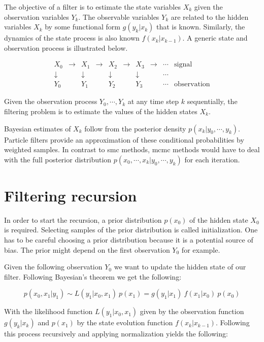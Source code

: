 The objective of a filter is to estimate the state variables $X_k$ given the observation variables $Y_k$. The observable variables $Y_k$ are related to the hidden variables $X_k$ by some functional form $g(y_k|x_k)$ that is known. Similarly, the dynamics of the state process is also known $f(x_k|x_{k-1})$. A generic state and observation process is illustrated below.

\[\begin{array}{cccccccccc}
X_0 & \to & X_1 & \to & X_2 & \to & X_3 & \to & \cdots & \text{signal} \\
\downarrow & & \downarrow & & \downarrow & & \downarrow & & \cdots & \\
Y_0 & & Y_1 & & Y_2 & & Y_3 & & \cdots & \text{observation}
\end{array}\]

Given the observation process $Y_0,\cdots ,Y_k$ at any time step $k$ sequentially, the filtering problem is to estimate the values of the hidden states $X_k$.

Bayesian estimates of $X_k$ follow from the posterior density $p(x_k|y_0,\cdots,y_k)$. Particle filters provide an approximation of these conditional probabilities by weighted samples. In contrast to \gls{smc} methods, \gls{mcmc} methods would have to deal with the full posterior distribution $p(x_0,\cdots,x_k|y_0,\cdots,y_k)$ for each iteration.

\section{Filtering recursion}

In order to start the recursion, a prior distribution $p(x_0)$ of the hidden state $X_0$ is required. Selecting samples of the prior distribution is called initialization. One has to be careful choosing a prior distribution because it is a potential source of bias. The prior might depend on the first observation $Y_0$ for example.

Given the following observation $Y_0$ we want to update the hidden state of our filter. Following Bayesian's theorem we get the following:

\[p(x_0,x_1|y_1) \sim L(y_1|x_0,x_1)\ p(x_1) = g(y_1|x_1)\ f(x_1|x_0)\ p(x_0)\]

With the likelihood function $L(y_1|x_0,x_1)$ given by the observation function $g(y_k|x_k)$ and $p(x_1)$ by the state evolution function $f(x_k|x_{k-1})$. Following this process recursively and applying normalization yields the following:

